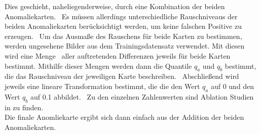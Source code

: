 Dies geschieht, naheliegenderweise, durch eine Kombination der beiden Anomaliekarten. \ 
Es müssen allerdings unterschiedliche Rauschniveaus der beiden Anomaliekarten berücksichtigt werden, um keine falschen Positive zu erzeugen. \
Um das Ausmaße des Rauschens für beide Karten zu bestimmen, werden ungesehene Bilder aus dem Trainingsdatensatz verwendet. Mit diesen wird eine Menge \
aller auftretenden Differenzen jeweils für beide Karten bestimmt. Mithilfe dieser Mengen werden dann die Quantile $q_{a}$ und $q_{b}$ bestimmt, die das Rauschniveau der jeweiligen Karte beschreiben. \
Abschließend wird jeweils eine lineare Transformation bestimmt, die die den Wert $q_{a}$ auf 0 und den Wert $q_{b}$ auf \num{0,1} abbildet. \
Zu den einzelnen Zahlenwerten sind Ablation Studien in \cite{efficientad} zu finden. \\
Die finale Anomliekarte ergibt sich dann einfach aus der Addition der beiden Anomaliekarten.  


